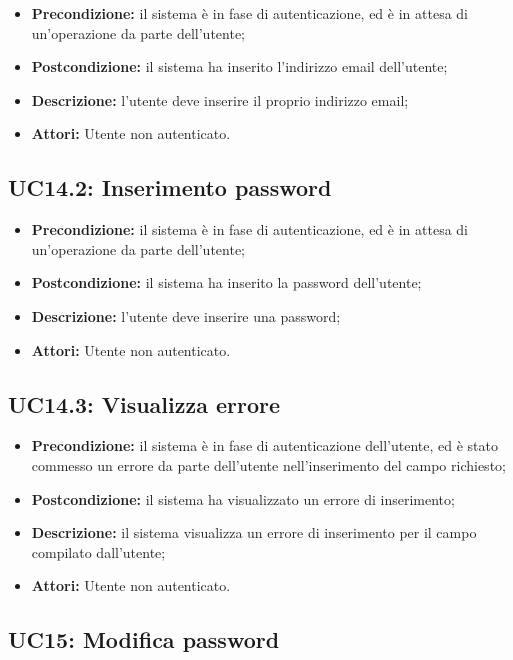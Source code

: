 \begin{itemize}
	\item \textbf{Precondizione:} il sistema è in fase di autenticazione, ed è in attesa di un'operazione da parte dell'utente;
	\item \textbf{Postcondizione:} il sistema ha inserito l'indirizzo email dell'utente;
	\item \textbf{Descrizione:} l'utente deve inserire il proprio indirizzo email;
	\item \textbf{Attori:} Utente non autenticato.
\end{itemize}
\subsection{ UC14.2: Inserimento password}

\begin{itemize}
	\item \textbf{Precondizione:} il sistema è in fase di autenticazione, ed è in attesa di un'operazione da parte dell'utente;
	\item \textbf{Postcondizione:} il sistema ha inserito la password dell'utente;
	\item \textbf{Descrizione:} l'utente deve inserire una password;
	\item \textbf{Attori:} Utente non autenticato.
\end{itemize}
\subsection{ UC14.3: Visualizza errore}

\begin{itemize}
	\item \textbf{Precondizione:} il sistema è in fase di autenticazione dell'utente, ed è stato commesso un errore da parte dell'utente nell'inserimento del campo richiesto;
	\item \textbf{Postcondizione:} il sistema ha visualizzato un errore di inserimento;
	\item \textbf{Descrizione:} il sistema visualizza un errore di inserimento per il campo compilato dall'utente;
	\item \textbf{Attori:} Utente non autenticato.
\end{itemize}
\subsection{ UC15: Modifica password}

